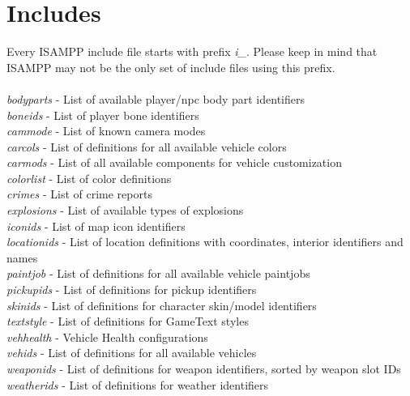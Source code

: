 \documentclass{article}
\begin{document}
\section{Includes}
Every ISAMPP include file starts with prefix \textit{i\_}. Please keep in mind that ISAMPP may not be the only set of include files using this prefix.
\\
\\
\textit{bodyparts} - List of available player/npc body part identifiers
\\
\textit{boneids} - List of player bone identifiers
\\
\textit{cammode} - List of known camera modes
\\
\textit{carcols} - List of definitions for all available vehicle colors
\\
\textit{carmods} - List of all available components for vehicle customization
\\
\textit{colorlist} - List of color definitions
\\
\textit{crimes} - List of crime reports
\\
\textit{explosions} - List of available types of explosions
\\
\textit{iconids} - List of map icon identifiers
\\
\textit{locationids} - List of location definitions with coordinates, interior identifiers and names
\\
\textit{paintjob} - List of definitions for all available vehicle paintjobs
\\
\textit{pickupids} - List of definitions for pickup identifiers
\\
\textit{skinids} - List of definitions for character skin/model identifiers
\\
\textit{textstyle} - List of definitions for GameText styles
\\
\textit{vehhealth} - Vehicle Health configurations
\\
\textit{vehids} - List of definitions for all available vehicles
\\
\textit{weaponids} - List of definitions for weapon identifiers, sorted by weapon slot IDs
\\
\textit{weatherids} - List of definitions for weather identifiers


\newpage
\end{document}
